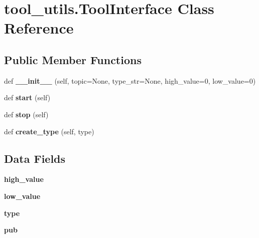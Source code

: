 \hypertarget{classtool__utils_1_1ToolInterface}{}\section{tool\+\_\+utils.\+Tool\+Interface Class Reference}
\label{classtool__utils_1_1ToolInterface}
\subsection*{Public Member Functions}
\begin{DoxyCompactItemize}
\item 
\mbox{\label{classtool__utils_1_1ToolInterface_a8a7b53eabb3284c281d1ea5d637d2a15}} 
def {\bfseries \+\_\+\+\_\+init\+\_\+\+\_\+} (self, topic=None, type\+\_\+str=None, high\+\_\+value=0, low\+\_\+value=0)
\item 
\mbox{\label{classtool__utils_1_1ToolInterface_ad8412e422a0b67e2d7bc8ef446226cb4}} 
def {\bfseries start} (self)
\item 
\mbox{\label{classtool__utils_1_1ToolInterface_a246496a859a6dfd4d8e21f0689f0b412}} 
def {\bfseries stop} (self)
\item 
\mbox{\label{classtool__utils_1_1ToolInterface_af2036c572ae42f0869d70447be65d313}} 
def {\bfseries create\+\_\+type} (self, type)
\end{DoxyCompactItemize}
\subsection*{Data Fields}
\begin{DoxyCompactItemize}
\item 
\mbox{\label{classtool__utils_1_1ToolInterface_a9615a1f1391b8f734da07afd8a6d644f}} 
{\bfseries high\+\_\+value}
\item 
\mbox{\label{classtool__utils_1_1ToolInterface_a91a8d81d907a455db218cbf27aa819e8}} 
{\bfseries low\+\_\+value}
\item 
\mbox{\label{classtool__utils_1_1ToolInterface_a0ef33b18978bafc1c0a7d44110ef01c2}} 
{\bfseries type}
\item 
\mbox{\label{classtool__utils_1_1ToolInterface_a50b15ff2d3e5fef6f12f2a421314bf7b}} 
{\bfseries pub}
\end{DoxyCompactItemize}



